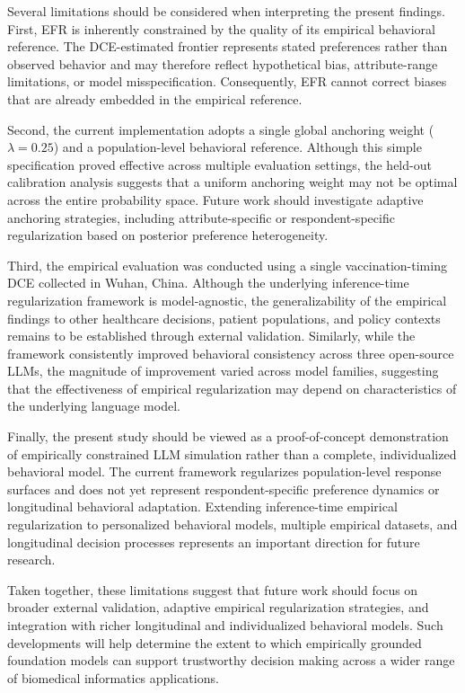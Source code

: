 \documentclass[11pt]{article}
\begin{document}
Several limitations should be considered when interpreting the present findings. First, EFR is inherently constrained by the quality of its empirical behavioral reference. The DCE-estimated frontier represents stated preferences rather than observed behavior and may therefore reflect hypothetical bias, attribute-range limitations, or model misspecification. Consequently, EFR cannot correct biases that are already embedded in the empirical reference.

Second, the current implementation adopts a single global anchoring weight ($\lambda=0.25$) and a population-level behavioral reference. Although this simple specification proved effective across multiple evaluation settings, the held-out calibration analysis suggests that a uniform anchoring weight may not be optimal across the entire probability space. Future work should investigate adaptive anchoring strategies, including attribute-specific or respondent-specific regularization based on posterior preference heterogeneity.

Third, the empirical evaluation was conducted using a single vaccination-timing DCE collected in Wuhan, China. Although the underlying inference-time regularization framework is model-agnostic, the generalizability of the empirical findings to other healthcare decisions, patient populations, and policy contexts remains to be established through external validation. Similarly, while the framework consistently improved behavioral consistency across three open-source LLMs, the magnitude of improvement varied across model families, suggesting that the effectiveness of empirical regularization may depend on characteristics of the underlying language model.

Finally, the present study should be viewed as a proof-of-concept demonstration of empirically constrained LLM simulation rather than a complete, individualized behavioral model. The current framework regularizes population-level response surfaces and does not yet represent respondent-specific preference dynamics or longitudinal behavioral adaptation. Extending inference-time empirical regularization to personalized behavioral models, multiple empirical datasets, and longitudinal decision processes represents an important direction for future research.

Taken together, these limitations suggest that future work should focus on broader external validation, adaptive empirical regularization strategies, and integration with richer longitudinal and individualized behavioral models. Such developments will help determine the extent to which empirically grounded foundation models can support trustworthy decision making across a wider range of biomedical informatics applications.
\end{document}
